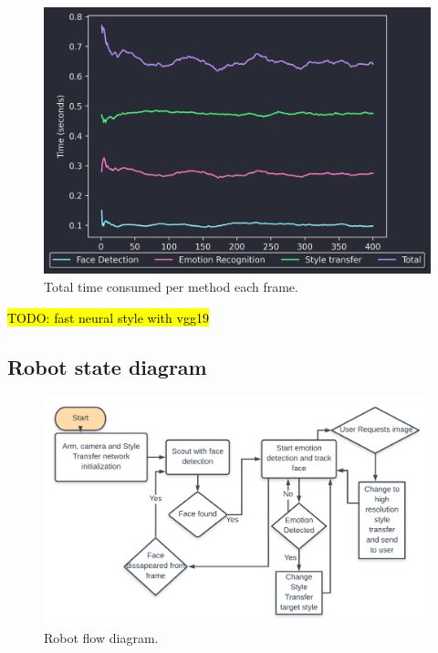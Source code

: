 \begin{figure}[h]
    \centering
        \includegraphics[width=\textwidth]{resources/total_frame_time.png}        
        \caption{Total time consumed per method each frame.}
        \label{fig:total_frame_time}
\end{figure}


\hl{TODO: fast neural style with vgg19}



\subsection{Robot state diagram}

\begin{figure}[h]
  \centering
  \includegraphics[width=\textwidth]{resources/state_machine.png}
  \caption{Robot flow diagram.}\label{fig:state_machine}
\end{figure}
